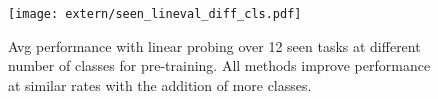 \begin{figure}[h]
    \centering
    \texttt{[image: extern/seen\_lineval\_diff\_cls.pdf]}
    \caption{Avg performance with linear probing over 12 seen tasks at different number of classes for pre-training. All methods improve performance at similar rates with the addition of more classes.}
    \label{fig:diff_num_cls_lineval}
\end{figure}